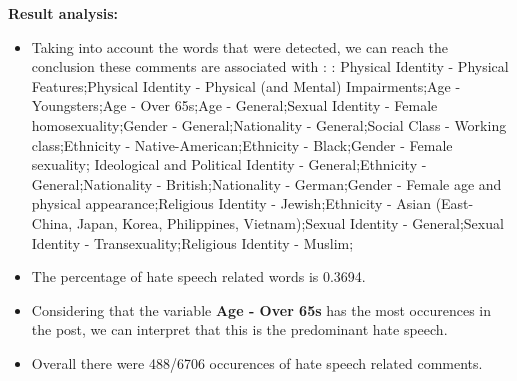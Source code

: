 \documentclass[11pt]{article}
\begin{document}
\textbf{\Large Result analysis:}

\begin{itemize}\item Taking into account the words that were detected, we can reach the conclusion these comments are associated with : : Physical Identity - Physical Features;Physical Identity - Physical (and Mental) Impairments;Age - Youngsters;Age - Over 65s;Age - General;Sexual Identity - Female homosexuality;Gender - General;Nationality - General;Social Class - Working class;Ethnicity - Native-American;Ethnicity - Black;Gender - Female sexuality; Ideological and Political Identity - General;Ethnicity - General;Nationality - British;Nationality - German;Gender - Female age and physical appearance;Religious Identity - Jewish;Ethnicity - Asian (East- China, Japan, Korea, Philippines, Vietnam);Sexual Identity - General;Sexual Identity - Transexuality;Religious Identity - Muslim;%

\item The percentage of hate speech related words is 0.3694.

\item Considering that the variable \textbf{Age - Over 65s} has the most occurences in the post, we can interpret that this is the predominant hate speech.

\item Overall there were 488/6706 occurences of hate speech related comments.\end{itemize}
\end{document}
